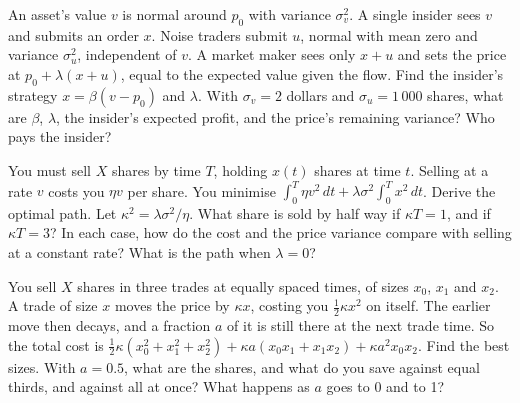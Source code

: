 \begin{question}\label{iq:iv2:markets-and-microstructure:48}
An asset's value $v$ is normal around $p_0$ with variance $\sigma_v^2$. A single insider sees $v$ and submits an order $x$. Noise traders submit $u$, normal with mean zero and variance $\sigma_u^2$, independent of $v$. A market maker sees only $x + u$ and sets the price at $p_0 + \lambda(x + u)$, equal to the expected value given the flow. Find the insider's strategy $x = \beta(v - p_0)$ and $\lambda$. With $\sigma_v = 2$ dollars and $\sigma_u = 1\,000$ shares, what are $\beta$, $\lambda$, the insider's expected profit, and the price's remaining variance? Who pays the insider?
\end{question}

\begin{question}\label{iq:iv2:markets-and-microstructure:49}
You must sell $X$ shares by time $T$, holding $x(t)$ shares at time $t$. Selling at a rate $v$ costs you $\eta v$ per share. You minimise $\int_0^T \eta v^2\,dt + \lambda\sigma^2\int_0^T x^2\,dt$. Derive the optimal path. Let $\kappa^2 = \lambda\sigma^2/\eta$. What share is sold by half way if $\kappa T = 1$, and if $\kappa T = 3$? In each case, how do the cost and the price variance compare with selling at a constant rate? What is the path when $\lambda = 0$?
\end{question}

\begin{question}\label{iq:iv2:markets-and-microstructure:50}
You sell $X$ shares in three trades at equally spaced times, of sizes $x_0$, $x_1$ and $x_2$. A trade of size $x$ moves the price by $\kappa x$, costing you $\tfrac12\kappa x^2$ on itself. The earlier move then decays, and a fraction $a$ of it is still there at the next trade time. So the total cost is $\tfrac12\kappa\left(x_0^2 + x_1^2 + x_2^2\right) + \kappa a\left(x_0x_1 + x_1x_2\right) + \kappa a^2 x_0x_2$. Find the best sizes. With $a = 0.5$, what are the shares, and what do you save against equal thirds, and against all at once? What happens as $a$ goes to 0 and to 1?
\end{question}
